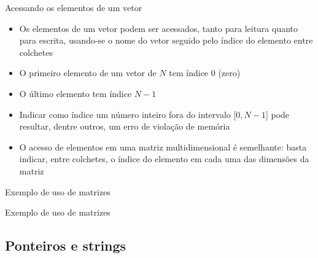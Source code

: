 \begin{frame}[fragile]{Acessando os elementos de um vetor}

	\begin{itemize}
		\item Os elementos de um vetor podem ser acessados, tanto para leitura quanto para escrita,
        usando-se o nome do vetor seguido pelo índice do elemento entre colchetes

		\item O primeiro elemento de um vetor de $N$ tem índice 0 (zero)

        \item O último elemento tem índice $N-1$

		\item Indicar como índice um número inteiro fora do intervalo [$0, N-1$] pode resultar, 
        dentre outros, um erro de violação de memória

        \item O acesso de elementos em uma matriz multidimensional é semelhante: basta indicar,
        entre colchetes, o índice do elemento em cada uma das dimensões da matriz
	\end{itemize}
 
\end{frame} 
  
\begin{frame}[fragile]{Exemplo de uso de matrizes}
\end{frame}

\begin{frame}[fragile]{Exemplo de uso de matrizes}
\end{frame}

\subsection{Ponteiros e strings}

